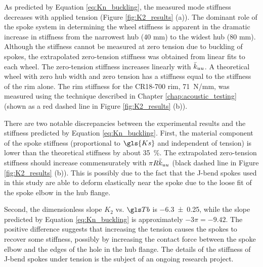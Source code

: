 \documentclass[\rootdir/thesis.tex]{subfiles}
\begin{document}
As predicted by Equation \eqref{eq:Kn_buckling}, the measured mode stiffness decreases with applied tension (Figure \ref{fig:K2_results} (a)). The dominant role of the spoke system in determining the wheel stiffness is apparent in the dramatic increase in stiffness from the narrowest hub (40 mm) to the widest hub (80 mm). Although the stiffness cannot be measured at zero tension due to buckling of spokes, the extrapolated zero-tension stiffness was obtained from linear fits to each wheel. The zero-tension stiffness increases linearly with $\bar{k}_{uu}$. A theoretical wheel with zero hub width and zero tension has a stiffness equal to the stiffness of the rim alone. The rim stiffness for the CR18-700 rim, \SI{71}{N/mm}, was measured using the technique described in Chapter \ref{chap:acoustic_testing} (shown as a red dashed line in Figure \ref{fig:K2_results} (b)).

There are two notable discrepancies between the experimental results and the stiffness predicted by Equation \eqref{eq:Kn_buckling}. First, the material component of the spoke stiffness (proportional to $\gls{Ks}$ and independent of tension) is lower than the theoretical stiffness by about \SI{35}{\percent}. The extrapolated zero-tension stiffness should increase commensurately with $\pi R\bar{k}_{uu}$ (black dashed line in Figure \ref{fig:K2_results} (b)). This is possibly due to the fact that the J-bend spokes used in this study are able to deform elastically near the spoke due to the loose fit of the spoke elbow in the hub flange.

Second, the dimensionless slope $K_2$ vs. $\Tb$ is \num{-6.3+-0.25}, while the slope predicted by Equation \eqref{eq:Kn_buckling} is approximately $-3\pi = -9.42$. The positive difference suggests that increasing the tension causes the spokes to recover some stiffness, possibly by increasing the contact force between the spoke elbow and the edges of the hole in the hub flange. The details of the stiffness of J-bend spokes under tension is the subject of an ongoing research project.
\end{document}
